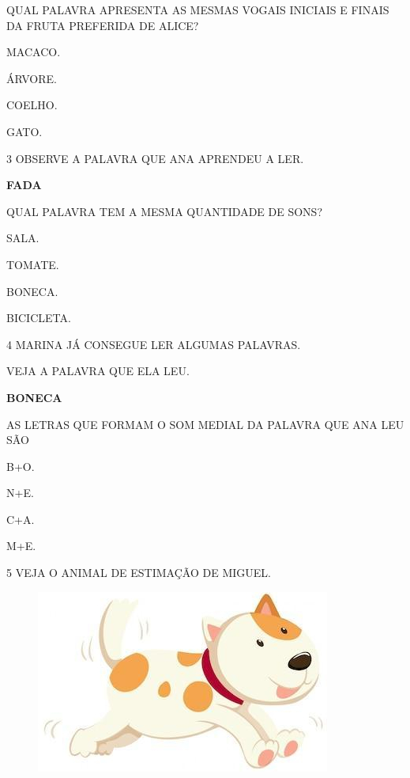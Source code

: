 \pagebreak
QUAL PALAVRA APRESENTA AS MESMAS VOGAIS INICIAIS E FINAIS DA FRUTA PREFERIDA DE ALICE?

\begin{escolha}
\item MACACO.

\item ÁRVORE.

\item COELHO.

\item GATO.
\end{escolha}


\num{3} OBSERVE A PALAVRA QUE ANA APRENDEU A LER.

\begin{myquote}
\textbf{FADA}
\end{myquote}

QUAL PALAVRA TEM A MESMA QUANTIDADE DE SONS?

\begin{escolha}
\item SALA.

\item TOMATE.

\item BONECA.

\item BICICLETA.
\end{escolha}


\num{4} MARINA JÁ CONSEGUE LER ALGUMAS PALAVRAS.

VEJA A PALAVRA QUE ELA LEU.

\begin{myquote}
\textbf{BONECA}
\end{myquote}

\pagebreak
AS LETRAS QUE FORMAM O SOM MEDIAL DA PALAVRA QUE ANA LEU SÃO

\begin{escolha}
\item B+O.

\item N+E.

\item C+A.

\item M+E.
\end{escolha}

\num{5} VEJA O ANIMAL DE ESTIMAÇÃO DE MIGUEL.

\begin{figure}[htpb]
\centering
\includegraphics[width=.55\textwidth]{media/image214.jpg}
\end{figure}

